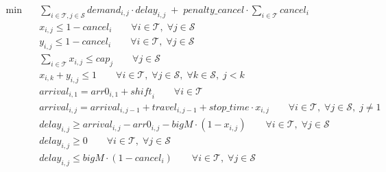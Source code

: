 \begin{align}
  \min\quad & \sum_{i \in \mathcal{T}, j \in \mathcal{S}} \mathit{demand}_{i,j} \cdot \mathit{delay}_{i,j} \;+\; \mathit{penalty\_cancel} \cdot \sum_{i \in \mathcal{T}} \mathit{cancel}_{i} \tag{obj\_total\_delay} \\
  & \mathit{x}_{i,j} \le 1 - \mathit{cancel}_{i} \qquad \forall i \in \mathcal{T},\; \forall j \in \mathcal{S} \tag{canc\_stop} \\
  & \mathit{y}_{i,j} \le 1 - \mathit{cancel}_{i} \qquad \forall i \in \mathcal{T},\; \forall j \in \mathcal{S} \tag{canc\_shortturn} \\
  & \sum_{i \in \mathcal{T}} \mathit{x}_{i,j} \le \mathit{cap}_{j} \qquad \forall j \in \mathcal{S} \tag{platform\_cap} \\
  & \mathit{x}_{i,k} + \mathit{y}_{i,j} \le 1 \qquad \forall i \in \mathcal{T},\; \forall j \in \mathcal{S},\; \forall k \in \mathcal{S},\; j < k \tag{shortturn\_consistency} \\
  & \mathit{arrival}_{i,1} = \mathit{arr0}_{i,1} + \mathit{shift}_{i} \qquad \forall i \in \mathcal{T} \tag{arrival\_start} \\
  & \mathit{arrival}_{i,j} = \mathit{arrival}_{i,j-1} + \mathit{travel}_{i,j-1} + \mathit{stop\_time} \cdot \mathit{x}_{i,j} \qquad \forall i \in \mathcal{T},\; \forall j \in \mathcal{S},\; j \neq 1 \tag{arrival\_propagation} \\
  & \mathit{delay}_{i,j} \ge \mathit{arrival}_{i,j} - \mathit{arr0}_{i,j} - \mathit{bigM} \cdot (1 - \mathit{x}_{i,j}) \qquad \forall i \in \mathcal{T},\; \forall j \in \mathcal{S} \tag{delay\_def} \\
  & \mathit{delay}_{i,j} \ge 0 \qquad \forall i \in \mathcal{T},\; \forall j \in \mathcal{S} \tag{delay\_nonneg} \\
  & \mathit{delay}_{i,j} \le \mathit{bigM} \cdot (1 - \mathit{cancel}_{i}) \qquad \forall i \in \mathcal{T},\; \forall j \in \mathcal{S} \tag{cancel\_delay} \\
\end{align}
